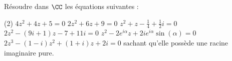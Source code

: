 %
%
	Résoudre dans $\CC$ les équations suivantes :
	\begin{tasks}(2)
		\task $4z^2 + 4z + 5 = 0$
		\task $2z^2 + 6z + 9= 0$
		\task $z^2 + z - \frac{1}{4} +\frac{1}{2}i = 0$
		\task $2z^2-(9i+1)z-7+11i=0$
		\task $z^2 - 2 e^{i\alpha} z + 2ie^{i\alpha}\sin(\alpha) = 0$
		\task $2z^3 -(1-i)z^2 + (1+i)z+2i=0$ sachant qu'elle possède une racine imaginaire pure.
	\end{tasks}
